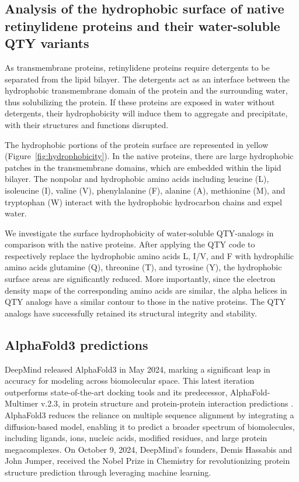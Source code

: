 \documentclass[fleqn, 10pt]{manuscript}
\begin{document}
\subsection*{Analysis of the hydrophobic surface of native retinylidene proteins and their water-soluble QTY variants}

As transmembrane proteins, retinylidene proteins require detergents to be separated from the lipid bilayer. The detergents act as an interface between the hydrophobic transmembrane domain of the protein and the surrounding water, thus solubilizing the protein. If these proteins are exposed in water without detergents, their hydrophobicity will induce them to aggregate and precipitate, with their structures and functions disrupted. 

The hydrophobic portions of the protein surface are represented in yellow (Figure~\ref{fig:hydrophobicity}). In the native proteins, there are large hydrophobic patches in the transmembrane domains, which are embedded within the lipid bilayer. The nonpolar and hydrophobic amino acids including leucine (L), isoleucine (I), valine (V), phenylalanine (F), alanine (A), methionine (M), and tryptophan (W) interact with the hydrophobic hydrocarbon chains and expel water. 

We investigate the surface hydrophobicity of water-soluble QTY-analogs in comparison with the native proteins. After applying the QTY code to respectively replace the hydrophobic amino acids L, I/V, and F with hydrophilic amino acids glutamine (Q), threonine (T), and tyrosine (Y), the hydrophobic surface areas are significantly reduced. More importantly, since the electron density maps of the corresponding amino acids are similar, the alpha helices in QTY analogs have a similar contour to those in the native proteins. The QTY analogs have successfully retained its structural integrity and stability. 

\subsection*{AlphaFold3 predictions}

DeepMind released AlphaFold3 in May 2024, marking a significant leap in accuracy for modeling across biomolecular space. This latest iteration outperforms state-of-the-art docking tools and its predecessor, AlphaFold-Multimer v.2.3, in protein structure and protein-protein interaction predictions \citep{Abramson_2024}. AlphaFold3 reduces the reliance on multiple sequence alignment by integrating a diffusion-based model, enabling it to predict a broader spectrum of biomolecules, including ligands, ions, nucleic acids, modified residues, and large protein megacomplexes. On October 9, 2024, DeepMind’s founders, Demis Hassabis and John Jumper, received the Nobel Prize in Chemistry for revolutionizing protein structure prediction through leveraging machine learning. 
\end{document}
